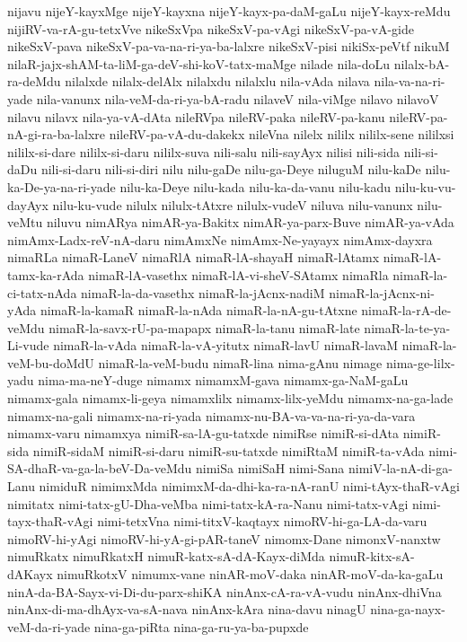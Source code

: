 {nijavu
nijeY-kayxMge
nijeY-kayxna
nijeY-kayx-pa-daM-gaLu
nijeY-kayx-reMdu
nijiRV-va-rA-gu-tetxVve
nikeSxVpa
nikeSxV-pa-vAgi
nikeSxV-pa-vA-gide
nikeSxV-pava
nikeSxV-pa-va-na-ri-ya-ba-lalxre
nikeSxV-pisi
nikiSx-peVtf
nikuM
nilaR-jajx-shAM-ta-liM-ga-deV-shi-koV-tatx-maMge
nilade
nila-doLu
nilalx-bA-ra-deMdu
nilalxde
nilalx-delAlx
nilalxdu
nilalxlu
nila-vAda
nilava
nila-va-na-ri-yade
nila-vanunx
nila-veM-da-ri-ya-bA-radu
nilaveV
nila-viMge
nilavo
nilavoV
nilavu
nilavx
nila-ya-vA-dAta
nileRVpa
nileRV-paka
nileRV-pa-kanu
nileRV-pa-nA-gi-ra-ba-lalxre
nileRV-pa-vA-du-dakekx
nileVna
nilelx
nililx
nililx-sene
nililxsi
nililx-si-dare
nililx-si-daru
nililx-suva
nili-salu
nili-sayAyx
nilisi
nili-sida
nili-si-daDu
nili-si-daru
nili-si-diri
nilu
nilu-gaDe
nilu-ga-Deye
niluguM
nilu-kaDe
nilu-ka-De-ya-na-ri-yade
nilu-ka-Deye
nilu-kada
nilu-ka-da-vanu
nilu-kadu
nilu-ku-vu-dayAyx
nilu-ku-vude
nilulx
nilulx-tAtxre
nilulx-vudeV
niluva
nilu-vanunx
nilu-veMtu
niluvu
nimARya
nimAR-ya-Bakitx
nimAR-ya-parx-Buve
nimAR-ya-vAda
nimAmx-Ladx-reV-nA-daru
nimAmxNe
nimAmx-Ne-yayayx
nimAmx-dayxra
nimaRLa
nimaR-LaneV
nimaRlA
nimaR-lA-shayaH
nimaR-lAtamx
nimaR-lA-tamx-ka-rAda
nimaR-lA-vasethx
nimaR-lA-vi-sheV-SAtamx
nimaRla
nimaR-la-ci-tatx-nAda
nimaR-la-da-vasethx
nimaR-la-jAcnx-nadiM
nimaR-la-jAcnx-ni-yAda
nimaR-la-kamaR
nimaR-la-nAda
nimaR-la-nA-gu-tAtxne
nimaR-la-rA-de-veMdu
nimaR-la-savx-rU-pa-mapapx
nimaR-la-tanu
nimaR-late
nimaR-la-te-ya-Li-vude
nimaR-la-vAda
nimaR-la-vA-yitutx
nimaR-lavU
nimaR-lavaM
nimaR-la-veM-bu-doMdU
nimaR-la-veM-budu
nimaR-lina
nima-gAnu
nimage
nima-ge-lilx-yadu
nima-ma-neY-duge
nimamx
nimamxM-gava
nimamx-ga-NaM-gaLu
nimamx-gala
nimamx-li-geya
nimamxlilx
nimamx-lilx-yeMdu
nimamx-na-ga-lade
nimamx-na-gali
nimamx-na-ri-yada
nimamx-nu-BA-va-va-na-ri-ya-da-vara
nimamx-varu
nimamxya
nimiR-sa-lA-gu-tatxde
nimiRse
nimiR-si-dAta
nimiR-sida
nimiR-sidaM
nimiR-si-daru
nimiR-su-tatxde
nimiRtaM
nimiR-ta-vAda
nimi-SA-dhaR-va-ga-la-beV-Da-veMdu
nimiSa
nimiSaH
nimi-Sana
nimiV-la-nA-di-ga-Lanu
nimiduR
nimimxMda
nimimxM-da-dhi-ka-ra-nA-ranU
nimi-tAyx-thaR-vAgi
nimitatx
nimi-tatx-gU-Dha-veMba
nimi-tatx-kA-ra-Nanu
nimi-tatx-vAgi
nimi-tayx-thaR-vAgi
nimi-tetxVna
nimi-titxV-kaqtayx
nimoRV-hi-ga-LA-da-varu
nimoRV-hi-yAgi
nimoRV-hi-yA-gi-pAR-taneV
nimomx-Dane
nimonxV-nanxtw
nimuRkatx
nimuRkatxH
nimuR-katx-sA-dA-Kayx-diMda
nimuR-kitx-sA-dAKayx
nimuRkotxV
nimumx-vane
ninAR-moV-daka
ninAR-moV-da-ka-gaLu
ninA-da-BA-Sayx-vi-Di-du-parx-shiKA
ninAnx-cA-ra-vA-vudu
ninAnx-dhiVna
ninAnx-di-ma-dhAyx-va-sA-nava
ninAnx-kAra
nina-davu
ninagU
nina-ga-nayx-veM-da-ri-yade
nina-ga-piRta
nina-ga-ru-ya-ba-pupxde
}
